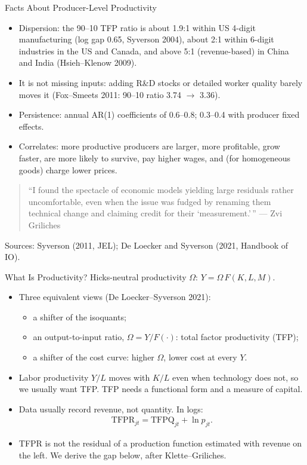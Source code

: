 \documentclass[aspectratio=169,10pt]{beamer}
\begin{document}
\begin{frame}{Facts About Producer-Level Productivity}
\begin{itemize}
\item \alert{Dispersion}: the 90--10 TFP ratio is about 1.9:1 within US 4-digit manufacturing (log gap 0.65, Syverson 2004), about 2:1 within 6-digit industries in the US and Canada, and above 5:1 (revenue-based) in China and India (Hsieh--Klenow 2009).
\item It is not missing inputs: adding R\&D stocks or detailed worker quality barely moves it (Fox--Smeets 2011: 90--10 ratio 3.74 $\to$ 3.36).
\item \alert{Persistence}: annual AR(1) coefficients of 0.6--0.8; 0.3--0.4 with producer fixed effects.
\item \alert{Correlates}: more productive producers are larger, more profitable, grow faster, are more likely to survive, pay higher wages, and (for homogeneous goods) charge lower prices.
\end{itemize}
\vfill
\begin{quote}
``I found the spectacle of economic models yielding large residuals rather uncomfortable, even when the issue was fudged by renaming them technical change and claiming credit for their `measurement.'\,'' --- Zvi Griliches
\end{quote}
{\footnotesize Sources: Syverson (2011, JEL); De Loecker and Syverson (2021, Handbook of IO).}
\end{frame}


\begin{frame}{What Is Productivity?}
Hicks-neutral productivity $\Omega$: \quad $Y = \Omega\, F(K, L, M)$.
\begin{itemize}
\item Three equivalent views (De Loecker--Syverson 2021):
\begin{itemize}
\item a shifter of the isoquants;
\item an output-to-input ratio, $\Omega = Y/F(\cdot)$: total factor productivity (TFP);
\item a shifter of the cost curve: higher $\Omega$, lower cost at every $Y$.
\end{itemize}
\item Labor productivity $Y/L$ moves with $K/L$ even when technology does not, so we usually want TFP. TFP needs a functional form and a measure of capital.
\item Data usually record revenue, not quantity. In logs:
\begin{align*}
\text{TFPR}_{jt} = \text{TFPQ}_{jt} + \ln p_{jt}.
\end{align*}
\item TFPR is \alert{not} the residual of a production function estimated with revenue on the left. We derive the gap below, after Klette--Griliches.
\end{itemize}
\end{frame}
\end{document}
